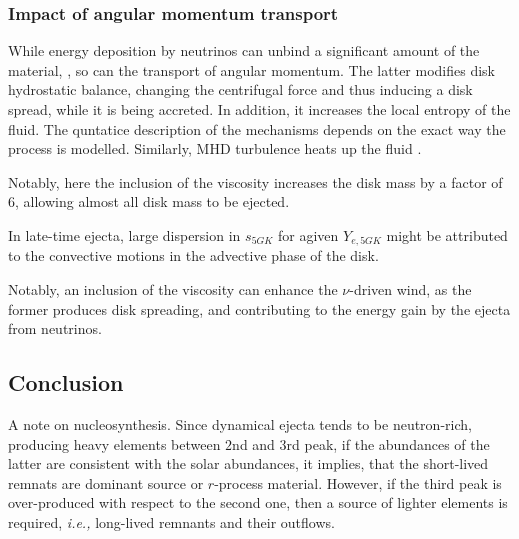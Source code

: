\documentclass[11pt,a4paper,headinclude=true,DIV=14,BCOR=8mm,chapterprefix,listof=totoc,twoside,openright,abstracton]{scrbook}
\begin{document}

\subsubsection{Impact of angular momentum transport}

While energy deposition by neutrinos can unbind a significant amount of the material, \cite{Ruffert et al., 1997}, so can the transport of angular momentum. The latter modifies disk hydrostatic balance, changing the centrifugal force and thus inducing a disk spread, while it is being accreted. In addition, it increases the local entropy of the fluid. The quntatice description of the mechanisms depends on the exact way the process is modelled. Similarly, MHD turbulence heats up the fluid \cite{Hirose et al., 2006}. 

Notably, here the inclusion of the viscosity increases the disk mass by a factor of $6$, allowing almost all disk mass to be ejected. 

In late-time ejecta, large dispersion in $s_{5GK}$ for agiven $Y_{e,5GK}$ might be attributed to the convective motions in the advective phase of the disk. 

Notably, an inclusion of the viscosity can enhance the $\nu$-driven wind, as the former produces disk spreading, and contributing to the energy gain by the ejecta from neutrinos. 

\subsection{Conclusion}

A note on nucleosynthesis. Since dynamical ejecta tends to be neutron-rich, producing heavy elements between $2$nd and $3$rd peak, if the abundances of the latter are consistent with the solar abundances, it implies, that the short-lived remnats are dominant source or $r$-process material. However, if the third peak is over-produced with respect to the second one, then a source of lighter elements is required, \textit{i.e.,} long-lived remnants and their outflows. 





\end{document}
